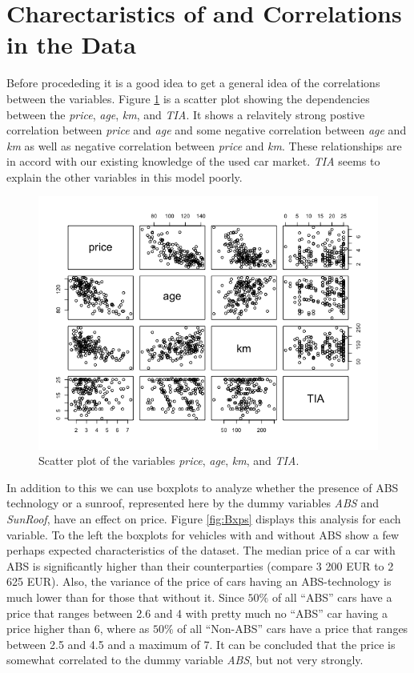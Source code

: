 \section{Charectaristics of and Correlations in the Data} %
\label{sec:Char_Corr}

Before procededing it is a good idea to get a general idea of the correlations between the variables. Figure \ref{fig:Scatter} is a scatter plot showing the dependencies between the \textit{price}, \textit{age}, \textit{km}, and \textit{TIA}. It shows a relavitely strong postive correlation between \textit{price} and \textit{age} and some negative correlation between \textit{age} and \textit{km} as well as negative correlation between \textit{price} and \textit{km}. These relationships are in accord with our existing knowledge of the used car market. \textit{TIA} seems to explain the other variables in this model poorly.

\begin{figure}[H]
  \begin{center}
    \includegraphics[scale=0.7]{./img/Scatter.png}
    \end{center}
  \caption{Scatter plot of the variables \textit{price}, \textit{age}, \textit{km}, and \textit{TIA}.}
  \label{fig:Scatter}
\end{figure}

\noindent
In addition to this we can use boxplots to analyze whether the presence of ABS technology or a sunroof, represented here by the dummy variables \textit{ABS} and \textit{SunRoof}, have an effect on price. Figure \ref{fig:Bxps} displays this analysis for each variable. To the left the boxplots for vehicles with and without ABS show a few perhaps expected characteristics of the dataset. The median price of a car with ABS is significantly higher than their counterparties (compare 3 200 EUR to 2 625 EUR). Also, the variance of the price of cars having an ABS-technology is much lower than for those that without it. Since $50\%$ of all ``ABS'' cars have a price that ranges between 2.6 and 4 with pretty much no ``ABS'' car having a price higher than 6, where as $50\%$ of all ``Non-ABS'' cars have a price that ranges between 2.5 and 4.5 and a maximum of 7. It can be concluded that the price is somewhat correlated to the dummy variable \textit{ABS}, but not very strongly.


